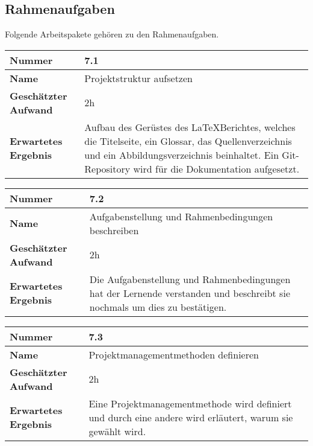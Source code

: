 \subsection{Rahmenaufgaben}
Folgende Arbeitspakete gehören zu den Rahmenaufgaben.

\begin{longtable}{p{}|p{}}
	\hline
	\textbf{Nummer}                 & \textbf{7.1}            \\
	\hline
	\textbf{Name}   				& Projektstruktur aufsetzen                  \\
	\hline
	\textbf{Geschätzter Aufwand}    & 2h                                    \\
	\hline
	\textbf{Erwartetes Ergebnis}    & Aufbau des Gerüstes des \LaTeX Berichtes, welches die Titelseite, ein Glossar, das Quellenverzeichnis und ein Abbildungsverzeichnis beinhaltet. Ein Git-Repository wird für die Dokumentation aufgesetzt.                                    \\
	\hline
\end{longtable}\label{tab:auswerten-7.1}

\begin{longtable}{p{}|p{}}
	\hline
	\textbf{Nummer}                 & \textbf{7.2}            \\
	\hline
	\textbf{Name}   				& Aufgabenstellung und Rahmenbedingungen beschreiben                  \\
	\hline
	\textbf{Geschätzter Aufwand}    & 2h                                    \\
	\hline
	\textbf{Erwartetes Ergebnis}    & Die Aufgabenstellung und Rahmenbedingungen hat der Lernende verstanden und beschreibt sie nochmals um dies zu bestätigen.                                    \\
	\hline
\end{longtable}\label{tab:rahmenaufgaben-7.2}

\begin{longtable}{p{}|p{}}
	\hline
	\textbf{Nummer}                 & \textbf{7.3}            \\
	\hline
	\textbf{Name}   				& Projektmanagementmethoden definieren                  \\
	\hline
	\textbf{Geschätzter Aufwand}    & 2h                                    \\
	\hline
	\textbf{Erwartetes Ergebnis}    & Eine Projektmanagementmethode wird definiert und durch eine andere wird erläutert, warum sie gewählt wird.                                    \\
	\hline
\end{longtable}\label{tab:rahmenaufgaben-7.3}

